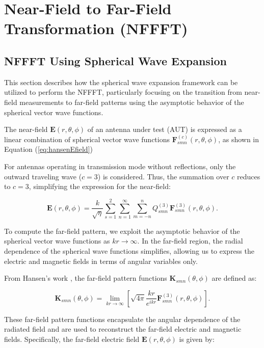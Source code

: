 \documentclass{article}
\begin{document}
\section{Near-Field to Far-Field Transformation (NFFFT)}
\subsection{NFFFT Using Spherical Wave Expansion}
This section describes how the spherical wave expansion framework can be utilized to perform the NFFFT, particularly focusing on the transition from near-field measurements to far-field patterns using the asymptotic behavior of the spherical vector wave functions.

The near-field $\mathbf{E}(r,\theta,\phi)$ of an antenna under test (AUT) is expressed as a linear combination of spherical vector wave functions $\mathbf{F}_{smn}^{(c)}(r,\theta,\phi)$, as shown in Equation (\ref{eq:hansenEfield})

For antennas operating in transmission mode without reflections, only the outward traveling wave ($c=3$) is considered. Thus, the summation over $c$ reduces to $c=3$, simplifying the expression for the near-field:

\begin{equation}
    \mathbf{E}(r,\theta,\phi) = \frac{k}{\sqrt{\eta}} \sum_{s=1}^2 \sum_{n=1}^\infty \sum_{m=-n}^n Q_{smn}^{(3)} \mathbf{F}_{smn}^{(3)}(r,\theta,\phi).
\end{equation}

To compute the far-field pattern, we exploit the asymptotic behavior of the spherical vector wave functions as $kr \to \infty$. In the far-field region, the radial dependence of the spherical wave functions simplifies, allowing us to express the electric and magnetic fields in terms of angular variables only.

From Hansen's work \cite{hansen1988spherical}, the far-field pattern functions $\mathbf{K}_{smn}(\theta,\phi)$ are defined as:

\begin{equation}
    \mathbf{K}_{smn}(\theta,\phi) = \lim_{kr \to \infty} \left[ \sqrt{4\pi} \frac{kr}{e^{ikr}} \mathbf{F}_{smn}^{(3)}(r,\theta,\phi) \right].
\end{equation}

These far-field pattern functions encapsulate the angular dependence of the radiated field and are used to reconstruct the far-field electric and magnetic fields. Specifically, the far-field electric field $\mathbf{E}(r,\theta,\phi)$ is given by:
\end{document}
